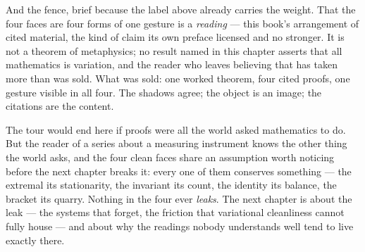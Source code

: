 And the fence, brief because the label above already carries the
weight. That the four faces are four forms of one gesture is a
\emph{reading} --- this book's arrangement of cited material, the kind
of claim its own preface licensed and no stronger. It is not a theorem
of metaphysics; no result named in this chapter asserts that all
mathematics is variation, and the reader who leaves believing that has
taken more than was sold. What was sold: one worked theorem, four cited
proofs, one gesture visible in all four. The shadows agree; the object
is an image; the citations are the content.

The tour would end here if proofs were all the world asked mathematics
to do. But the reader of a series about a measuring instrument knows
the other thing the world asks, and the four clean faces share an
assumption worth noticing before the next chapter breaks it: every one
of them conserves something --- the extremal its stationarity, the
invariant its count, the identity its balance, the bracket its quarry.
Nothing in the four ever \emph{leaks}. The next chapter is about the
leak --- the systems that forget, the friction that variational
cleanliness cannot fully house --- and about why the readings nobody
understands well tend to live exactly there.
